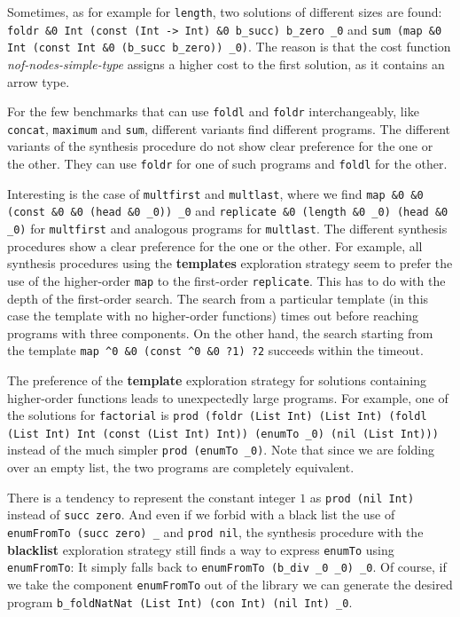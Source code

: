 Sometimes, as for example for \lstinline?length?, two solutions of different sizes are found: \lstinline?foldr &0 Int (const (Int -> Int) &0 b_succ) b_zero _0? and \lstinline?sum (map &0 Int (const Int &0 (b_succ b_zero)) _0)?. The reason is that the cost function \textit{nof-nodes-simple-type} assigns a higher cost to the first solution, as it contains an arrow type.

For the few benchmarks that can use \lstinline?foldl? and \lstinline?foldr? interchangeably, like \lstinline?concat?, \lstinline?maximum? and \lstinline?sum?, different variants find different programs. The different variants of the synthesis procedure do not show clear preference for the one or the other. They can use \lstinline?foldr? for one of such programs and \lstinline?foldl? for the other.

Interesting is the case of \lstinline?multfirst? and \lstinline?multlast?, where we find \lstinline?map &0 &0 (const &0 &0 (head &0 _0)) _0? and \lstinline?replicate &0 (length &0 _0) (head &0 _0)? for \lstinline?multfirst? and analogous programs for \lstinline?multlast?. The different synthesis procedures show a clear preference for the one or the other. For example, all synthesis procedures using the \textbf{templates} exploration strategy seem to prefer the use of the higher-order \lstinline?map? to the first-order \lstinline?replicate?. This has to do with the depth of the first-order search. The search from a particular template (in this case the template with no higher-order functions) times out before reaching programs with three components. On the other hand, the search starting from the template \lstinline!map ^0 &0 (const ^0 &0 ?1) ?2! succeeds within the timeout.

The preference of the \textbf{template} exploration strategy for solutions containing higher-order functions leads to unexpectedly large programs. For example, one of the solutions for \lstinline?factorial? is \lstinline?prod (foldr (List Int) (List Int) (foldl (List Int) Int (const (List Int) Int)) (enumTo _0) (nil (List Int)))? instead of the much simpler \lstinline?prod (enumTo _0)?. Note that since we are folding over an empty list, the two programs are completely equivalent.

There is a tendency to represent the constant integer $1$ as \lstinline?prod (nil Int)? instead of \lstinline?succ zero?. And even if we forbid with a black list the use of \lstinline?enumFromTo (succ zero) _? and \lstinline?prod nil?, the synthesis procedure with the \textbf{blacklist} exploration strategy still finds a way to express \lstinline?enumTo? using \lstinline?enumFromTo?: It simply falls back to \lstinline?enumFromTo (b_div _0 _0) _0?. Of course, if we take the component \lstinline?enumFromTo? out of the library we can generate the desired program \lstinline?b_foldNatNat (List Int) (con Int) (nil Int) _0?.

